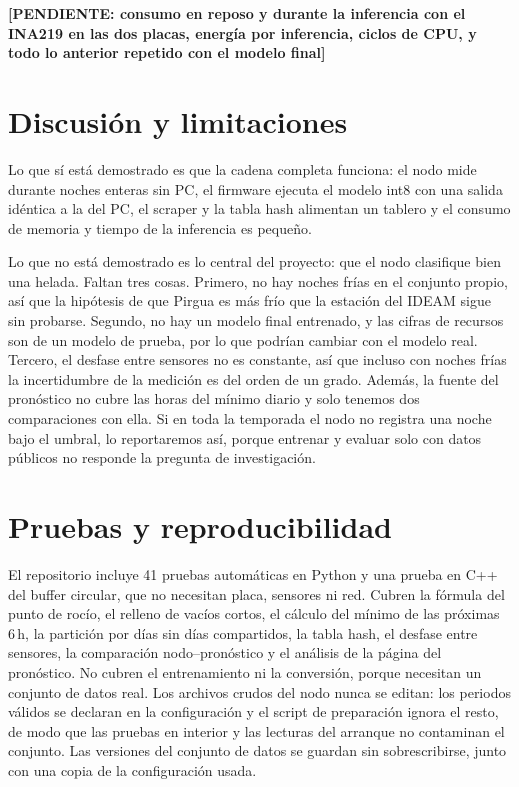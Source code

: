 \documentclass[conference]{IEEEtran}
\newcommand{\pend}[1]{\textcolor{red!70!black}{\textbf{[PENDIENTE: #1]}}}
\begin{document}
\pend{consumo en reposo y durante la inferencia con el INA219 en las dos placas, energ\'ia por inferencia, ciclos de CPU, y todo lo anterior repetido con el modelo final}

\section{Discusi\'on y limitaciones}
Lo que s\'i est\'a demostrado es que la cadena completa funciona: el nodo mide durante noches enteras sin PC, el firmware ejecuta el modelo int8 con una salida id\'entica a la del PC, el scraper y la tabla hash alimentan un tablero y el consumo de memoria y tiempo de la inferencia es peque\~no.

Lo que no est\'a demostrado es lo central del proyecto: que el nodo clasifique bien una helada. Faltan tres cosas. Primero, no hay noches fr\'ias en el conjunto propio, as\'i que la hip\'otesis de que Pirgua es m\'as fr\'io que la estaci\'on del IDEAM sigue sin probarse. Segundo, no hay un modelo final entrenado, y las cifras de recursos son de un modelo de prueba, por lo que podr\'ian cambiar con el modelo real. Tercero, el desfase entre sensores no es constante, as\'i que incluso con noches fr\'ias la incertidumbre de la medici\'on es del orden de un grado. Adem\'as, la fuente del pron\'ostico no cubre las horas del m\'inimo diario y solo tenemos dos comparaciones con ella. Si en toda la temporada el nodo no registra una noche bajo el umbral, lo reportaremos as\'i, porque entrenar y evaluar solo con datos p\'ublicos no responde la pregunta de investigaci\'on.

\section{Pruebas y reproducibilidad}
El repositorio incluye 41 pruebas autom\'aticas en Python y una prueba en C++ del buffer circular, que no necesitan placa, sensores ni red. Cubren la f\'ormula del punto de roc\'io, el relleno de vac\'ios cortos, el c\'alculo del m\'inimo de las pr\'oximas 6\,h, la partici\'on por d\'ias sin d\'ias compartidos, la tabla hash, el desfase entre sensores, la comparaci\'on nodo--pron\'ostico y el an\'alisis de la p\'agina del pron\'ostico. No cubren el entrenamiento ni la conversi\'on, porque necesitan un conjunto de datos real. Los archivos crudos del nodo nunca se editan: los periodos v\'alidos se declaran en la configuraci\'on y el script de preparaci\'on ignora el resto, de modo que las pruebas en interior y las lecturas del arranque no contaminan el conjunto. Las versiones del conjunto de datos se guardan sin sobrescribirse, junto con una copia de la configuraci\'on usada.
\end{document}
